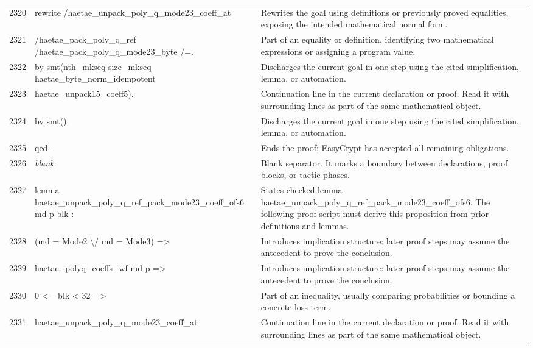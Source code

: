 \documentclass[10pt]{article}
\begin{document}
\begin{longtable}{r L{0.53\textwidth} L{0.37\textwidth}}
2320 & {\ttfamily\scriptsize   rewrite /haetae\_unpack\_poly\_q\_mode23\_coeff\_at} & Rewrites the goal using definitions or previously proved equalities, exposing the intended mathematical normal form. \\
2321 & {\ttfamily\scriptsize           /haetae\_pack\_poly\_q\_ref /haetae\_pack\_poly\_q\_mode23\_byte /=.} & Part of an equality or definition, identifying two mathematical expressions or assigning a program value. \\
2322 & {\ttfamily\scriptsize   by smt(nth\_mkseq size\_mkseq haetae\_byte\_norm\_idempotent} & Discharges the current goal in one step using the cited simplification, lemma, or automation. \\
2323 & {\ttfamily\scriptsize          haetae\_unpack15\_coeff5).} & Continuation line in the current declaration or proof.  Read it with surrounding lines as part of the same mathematical object. \\
2324 & {\ttfamily\scriptsize by smt().} & Discharges the current goal in one step using the cited simplification, lemma, or automation. \\
2325 & {\ttfamily\scriptsize qed.} & Ends the proof; EasyCrypt has accepted all remaining obligations. \\
2326 & {\ttfamily\scriptsize \emph{blank}} & Blank separator.  It marks a boundary between declarations, proof blocks, or tactic phases. \\
2327 & {\ttfamily\scriptsize lemma haetae\_unpack\_poly\_q\_ref\_pack\_mode23\_coeff\_ofs6 md p blk :} & States checked lemma haetae\_unpack\_poly\_q\_ref\_pack\_mode23\_coeff\_ofs6.  The following proof script must derive this proposition from prior definitions and lemmas. \\
2328 & {\ttfamily\scriptsize   (md = Mode2 \textbackslash{}/ md = Mode3) =>} & Introduces implication structure: later proof steps may assume the antecedent to prove the conclusion. \\
2329 & {\ttfamily\scriptsize   haetae\_polyq\_coeffs\_wf md p =>} & Introduces implication structure: later proof steps may assume the antecedent to prove the conclusion. \\
2330 & {\ttfamily\scriptsize   0 <= blk < 32 =>} & Part of an inequality, usually comparing probabilities or bounding a concrete loss term. \\
2331 & {\ttfamily\scriptsize   haetae\_unpack\_poly\_q\_mode23\_coeff\_at} & Continuation line in the current declaration or proof.  Read it with surrounding lines as part of the same mathematical object. \\

\end{longtable}
\end{document}
